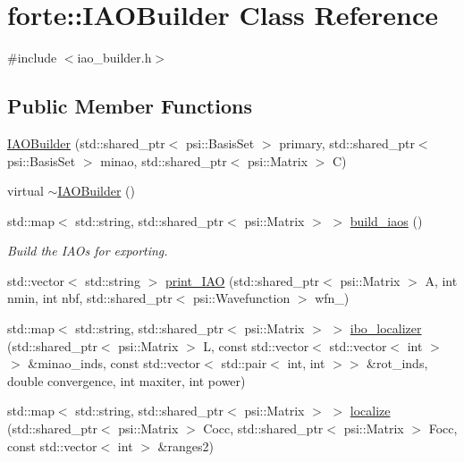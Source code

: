 \hypertarget{classforte_1_1_i_a_o_builder}{}\section{forte\+:\+:I\+A\+O\+Builder Class Reference}
\label{classforte_1_1_i_a_o_builder}


{\ttfamily \#include $<$iao\+\_\+builder.\+h$>$}

\subsection*{Public Member Functions}
\begin{DoxyCompactItemize}
\item 
\mbox{\hyperlink{classforte_1_1_i_a_o_builder_a0d7313fecbe0dab3d009ee61460a7ec7}{I\+A\+O\+Builder}} (std\+::shared\+\_\+ptr$<$ psi\+::\+Basis\+Set $>$ primary, std\+::shared\+\_\+ptr$<$ psi\+::\+Basis\+Set $>$ minao, std\+::shared\+\_\+ptr$<$ psi\+::\+Matrix $>$ C)
\item 
virtual \mbox{\hyperlink{classforte_1_1_i_a_o_builder_a7f7ae3b24a81f83ab6495b0fecec76f5}{$\sim$\+I\+A\+O\+Builder}} ()
\item 
std\+::map$<$ std\+::string, std\+::shared\+\_\+ptr$<$ psi\+::\+Matrix $>$ $>$ \mbox{\hyperlink{classforte_1_1_i_a_o_builder_a61476a3df5a98e9344df6dc50d44f7be}{build\+\_\+iaos}} ()
\begin{DoxyCompactList}\small\item\em Build the I\+A\+Os for exporting. \end{DoxyCompactList}\item 
std\+::vector$<$ std\+::string $>$ \mbox{\hyperlink{classforte_1_1_i_a_o_builder_a84a908f7c130656827e368d2a9509561}{print\+\_\+\+I\+AO}} (std\+::shared\+\_\+ptr$<$ psi\+::\+Matrix $>$ A, int nmin, int nbf, std\+::shared\+\_\+ptr$<$ psi\+::\+Wavefunction $>$ wfn\+\_\+)
\item 
std\+::map$<$ std\+::string, std\+::shared\+\_\+ptr$<$ psi\+::\+Matrix $>$ $>$ \mbox{\hyperlink{classforte_1_1_i_a_o_builder_a4f83305403a48c4f1b8462190f27ae88}{ibo\+\_\+localizer}} (std\+::shared\+\_\+ptr$<$ psi\+::\+Matrix $>$ L, const std\+::vector$<$ std\+::vector$<$ int $>$$>$ \&minao\+\_\+inds, const std\+::vector$<$ std\+::pair$<$ int, int $>$$>$ \&rot\+\_\+inds, double convergence, int maxiter, int power)
\item 
std\+::map$<$ std\+::string, std\+::shared\+\_\+ptr$<$ psi\+::\+Matrix $>$ $>$ \mbox{\hyperlink{classforte_1_1_i_a_o_builder_af01e3de02b115e1552ee442e58102c1d}{localize}} (std\+::shared\+\_\+ptr$<$ psi\+::\+Matrix $>$ Cocc, std\+::shared\+\_\+ptr$<$ psi\+::\+Matrix $>$ Focc, const std\+::vector$<$ int $>$ \&ranges2)

\end{DoxyCompactItemize}
